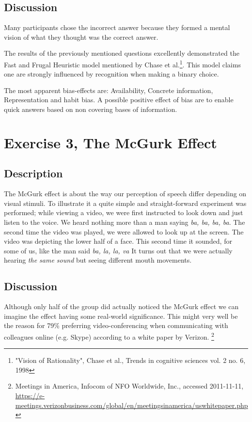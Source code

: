 \documentclass[10pt, a4paper]{article}
\begin{document}
\subsection{Discussion}
Many participants chose the incorrect answer because they formed a mental vision of what they thought was the correct answer. 

The results of the previously mentioned questions excellently demonstrated the Fast and Frugal Heuristic model mentioned by Chase et al.\footnote{"Vision of Rationality", Chase et al., Trends in cognitive sciences vol. 2 no. 6, 1998}. This model claims one are strongly influenced by recognition when making a binary choice. 

The most apparent bias-effects are: Availability, Concrete information, Representation and habit bias. A possible positive effect of bias are to enable quick answers based on non covering bases of information. 


\section{Exercise 3, The McGurk Effect}
\subsection{Description}
The McGurk effect is about the way our perception of speech differ depending on visual stimuli. To illustrate it a quite simple and straight-forward experiment was performed; while viewing a video, we were first instructed to look down and just listen to the voice. We heard nothing more than a man saying \emph{ba, ba, ba, ba}. The second time the video was played, we were allowed to look up at the screen. The video was depicting the lower half of a face.  This second time it sounded, for some of us, like the man said \emph{ba, la, la, va} It turns out that we were actually hearing \emph{the same sound} but seeing different mouth movements.

\subsection{Discussion}
Although only half of the group did actually noticed the McGurk effect we can imagine the effect having some real-world significance. This might very well be the reason for 79\% preferring video-conferencing when communicating with colleagues online (e.g. Skype) according to a white paper by Verizon. \footnote{Meetings in America, Infocom of NFO Worldwide, Inc., accessed 2011-11-11, \url{https://e-meetings.verizonbusiness.com/global/en/meetingsinamerica/uswhitepaper.php}}
\end{document}
